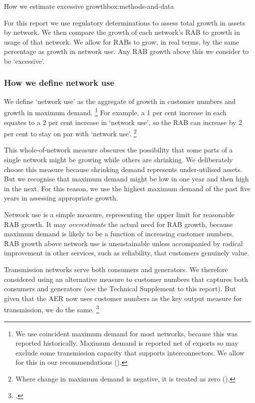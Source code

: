\documentclass[FrontPage]{grattan}
\begin{document}
\begin{bigbox}{How we estimate excessive growth}{box:methods-and-data}

For this report we use regulatory determinations to assess total growth in assets by network. We then compare the growth of each network's RAB to growth in usage of that network. We allow for RABs to grow, in real terms, by the same percentage as growth in network use. Any RAB growth above this we consider to be `excessive'. 

\subsubsection{How we define network use}
We define `network use' as the aggregate of growth in customer numbers and growth in maximum demand.%
\footnote{We use coincident maximum demand for most networks, because this was reported historically. Maximum demand is reported net of exports so may exclude some transmission capacity that supports interconnectors. We allow for this in our recommendations ().}
For example, a 1 per cent increase in each equates to a 2 per cent increase in `network use', so the RAB can increase by 2 per cent to stay on par with `network use'.%
\footnote{Where change in maximum demand is negative, it is treated as zero ().}

This whole-of-network measure obscures the possibility that some parts of a single network might be growing while others are shrinking. We deliberately choose this measure because shrinking demand represents under-utilised assets. But we recognise that maximum demand might be low in one year and then high in the next. For this reason, we use the highest maximum demand of the past five years in assessing appropriate growth.

Network use is a simple measure, representing the upper limit for reasonable RAB growth. It may \emph{overestimate} the actual need for RAB growth, because maximum demand is likely to be a function of increasing customer numbers. RAB growth above network use is unsustainable unless accompanied by radical improvement in other services, such as reliability, that customers genuinely value.

Transmission networks serve both consumers and generators. We therefore considered using an alternative measure to customer numbers that captures both consumers and generators (see the Technical Supplement to this report). But given that the AER now uses customer numbers as the key output measure for transmission, we do the same.%
\footcite{AER2017TNSPperformanceindicators}


\end{bigbox}
\end{document}
